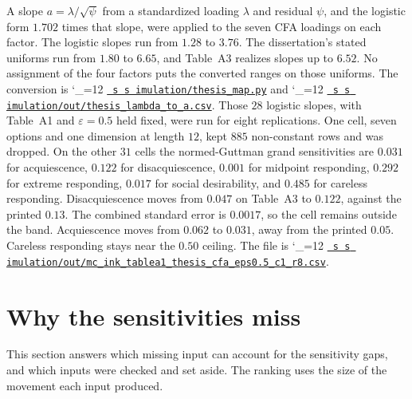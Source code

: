 \documentclass[11pt]{article}
\makeatletter
\newcommand{\proofbase}{https://github.com/alectionary/vibe-math/blob/master/formalization/polytomous-person-fit}
\def\pf@show#1{%
  \ifx\relax#1\else
    #1\allowbreak
    \expandafter\pf@show
  \fi}
\newcommand{\src}{\begingroup\catcode`\_=12 \pf@src}
\newcommand{\pf@src}[1]{%
  \edef\srcurl{\proofbase/#1}%
  \href{\srcurl}{\texttt{\pf@show#1\relax}}\endgroup}
\makeatother
\begin{document}
A slope \(a=\lambda/\sqrt{\psi}\) from a standardized loading \(\lambda\)
and residual \(\psi\), and the logistic form \(1.702\) times that slope,
were applied to the seven CFA loadings on each factor.
The logistic slopes run from \(1.28\) to \(3.76\).
The dissertation's stated uniforms run from \(1.80\) to \(6.65\), and
Table~A3 realizes slopes up to \(6.52\).
No assignment of the four factors puts the converted ranges on those
uniforms.
The conversion is \src{simulation/thesis_map.py} and
\src{simulation/out/thesis_lambda_to_a.csv}.
Those \(28\) logistic slopes, with Table~A1 and \(\varepsilon=0.5\)
held fixed, were run for eight replications.
One cell, seven options and one dimension at length \(12\), kept \(885\)
non-constant rows and was dropped.
On the other \(31\) cells the normed-Guttman grand sensitivities are
\(0.031\) for acquiescence, \(0.122\) for disacquiescence, \(0.001\) for
midpoint responding, \(0.292\) for extreme responding, \(0.017\) for
social desirability, and \(0.485\) for careless responding.
Disacquiescence moves from \(0.047\) on Table~A3 to \(0.122\), against
the printed \(0.13\).
The combined standard error is \(0.0017\), so the cell remains outside
the band.
Acquiescence moves from \(0.062\) to \(0.031\), away from the printed
\(0.05\).
Careless responding stays near the \(0.50\) ceiling.
The file is
\src{simulation/out/mc_ink_tablea1_thesis_cfa_eps0.5_c1_r8.csv}.

\section{Why the sensitivities miss}
\label{sec:why}

This section answers which missing input can account for the
sensitivity gaps, and which inputs were checked and set aside.
The ranking uses the size of the movement each input produced.
\end{document}
